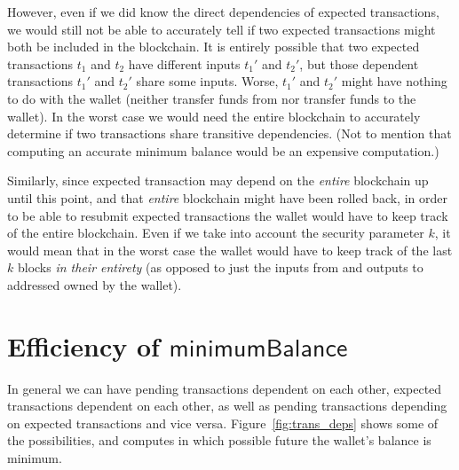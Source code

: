 \documentclass{article}
\numberwithin{equation}{lemma}
\begin{document}
However, even if we did know the direct dependencies of expected transactions,
we would still not be able to accurately tell if two expected transactions might
both be included in the blockchain. It is entirely possible that two expected
transactions $t_1$ and $t_2$ have different inputs $t_1'$ and $t_2'$, but those
dependent transactions $t_1'$ and $t_2'$ share some inputs. Worse, $t_1'$ and
$t_2'$ might have nothing to do with the wallet (neither transfer funds from nor
transfer funds to the wallet). In the worst case we would need the entire
blockchain to  accurately determine if two transactions share transitive
dependencies. (Not to mention that computing an accurate minimum balance
would be an expensive computation.)

Similarly, since expected transaction may depend on the \emph{entire} blockchain
up until this point, and that \emph{entire} blockchain might have been rolled
back, in order to be able to resubmit expected transactions the wallet would
have to keep track of the entire blockchain. Even if we take into account the
security parameter $k$, it would mean that in the worst case the wallet would
have to keep track of the last $k$ blocks \emph{in their entirety} (as opposed
to just the inputs from and outputs to addressed owned by the wallet).

\section{Efficiency of $\mathsf{minimumBalance}$}
\label{sec:computing_minimum_balance}

In general we can have pending transactions dependent on each other, expected
transactions dependent on each other, as well as pending transactions depending
on expected transactions and vice versa. Figure~\ref{fig:trans_deps} shows
some of the possibilities, and computes in which possible future the wallet's
balance is minimum.
\end{document}
